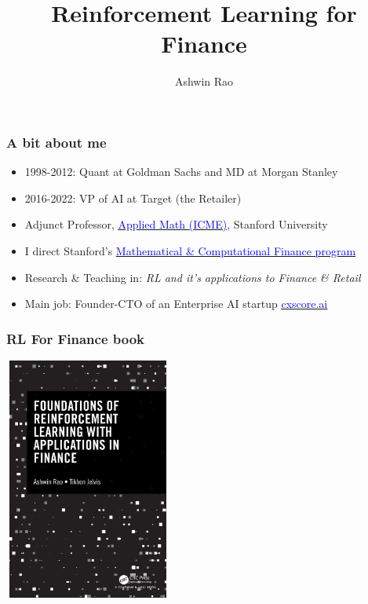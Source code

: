 \documentclass{beamer}
\title[RL for Finance]{Reinforcement Learning for Finance} %
\author{Ashwin Rao} %
\institute[Stanford] %
{Stanford University
}
\date{} %
\begin{document}
\begin{frame}
\titlepage %
\end{frame}



\begin{frame}
\frametitle{A bit about me}
\pause
\begin{itemize}[<+->]
\item 1998-2012: Quant at Goldman Sachs and MD at Morgan Stanley
\item 2016-2022: VP of AI at Target (the Retailer)
\item Adjunct Professor, \href{https://icme.stanford.edu/}{\underline{\textcolor{blue}{Applied Math (ICME)}}}, Stanford University
\item I direct Stanford's \href{https://mcf.stanford.edu/}{\underline{\textcolor{blue}{Mathematical \& Computational Finance program}}}
\item Research \& Teaching in: {\em RL and it's applications to Finance \& Retail}
\item Main job: Founder-CTO of an Enterprise AI startup \href{http://cxscore.ai}{\underline{\textcolor{blue}{cxscore.ai}}} 
\end{itemize}
\end{frame}

\begin{frame}
\frametitle{RL For Finance book}
\begin{center}
\includegraphics[width=5.5cm, height=8cm]{RLBook.jpeg}
\end{center}
\end{frame}
\end{document}
